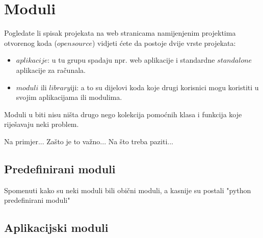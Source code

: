 \chapter{Moduli}

Pogledate li spisak projekata na web stranicama namijenjenim projektima otvorenog
koda ($open source$) vidjeti ćete da postoje dvije vrste projekata:

\begin{itemize}
	\item $aplikacije$: u tu grupu spadaju npr. web aplikacije i standardne $standalone$
		aplikacije za računala.
	\item $moduli$ ili $library$iji: a to su dijelovi koda koje drugi korisnici
		mogu koristiti u svojim aplikacijama ili modulima.
\end{itemize}

Moduli u biti nisu ništa drugo nego kolekcija pomoćnih klasa i funkcija koje riješavaju
neki problem. 

\TODO Na primjer... Zašto je to važno... Na što treba paziti...

\section{Predefinirani moduli}

\TODO 

\TODO Spomenuti kako su neki moduli bili obični moduli, a kasnije su postali "python
	predefinirani moduli"

\section{Aplikacijski moduli}

\TODO
